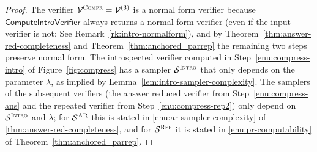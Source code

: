 \documentclass[11pt]{article}
\theoremstyle{definition}
\newcommand{\sampler}{\mathcal{S}}
\newcommand{\verifier}{\mathcal{V}}
\newcommand{\gamestyle}[1]{\ensuremath{\textsc{#1}}\xspace}
\newcommand{\ar}{\gamestyle{AR}}
\newcommand{\intro}{\gamestyle{Intro}}
\newcommand{\compr}{\textsc{Compr}}
\newcommand{\tmstyle}[1]{\ensuremath{\mathsf{#1}}}
\newcommand{\ComputeIntroVerifier}{\tmstyle{ComputeIntroVerifier}}
\newcommand{\rep}{\gamestyle{Rep}}
\begin{document}
\begin{proof}
  The verifier $\verifier^\compr = \verifier^{(3)}$ is a normal form verifier
  because $\ComputeIntroVerifier$ always returns a normal form verifier (even if
  the input verifier is not; See Remark~\ref{rk:intro-normalform}), and by
  Theorem~\ref{thm:answer-red-completeness} and
  Theorem~\ref{thm:anchored_parrep} the remaining two steps preserve normal
  form.
  The introspected verifier computed in Step~\ref{enu:compress-intro} of
  Figure~\ref{fig:compress} has a sampler $\sampler^\intro$ that only depends on
  the parameter $\lambda$, as implied by
  Lemma~\ref{lem:intro-sampler-complexity}.
  The samplers of the subsequent verifiers (the answer reduced verifier from
  Step~\ref{enu:compress-ans} and the repeated verifier from
  Step~\ref{enu:compress-rep2}) only depend on $\sampler^\intro$ and $\lambda$;
  for $\sampler^\ar$ this is stated in \cref{enu:ar-sampler-complexity} of
  \cref{thm:answer-red-completeness}, and for $\sampler^\rep$ it is stated in
  \cref{enu:pr-computability} of Theorem~\ref{thm:anchored_parrep}.
\end{proof}
\end{document}
